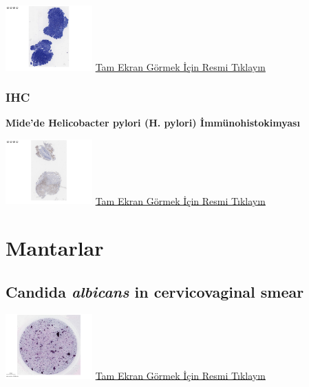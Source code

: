 \documentclass[
  letterpaper,
  DIV=11,
  numbers=noendperiod]{scrreprt}
\begin{document}
\href{https://images.patolojiatlasi.com/helicobacterpylori/giemsa.html}{\includegraphics[width=0.25\textwidth,height=\textheight]{./screenshots/thumbnail_helicobacterpyloriGiemsa.png}}
\href{https://images.patolojiatlasi.com/helicobacterpylori/giemsa.html}{Tam
Ekran Görmek İçin Resmi Tıklayın}

\hypertarget{ihc}{%
\subsection{IHC}\label{ihc}}

\textbf{Mide'de Helicobacter pylori (H. pylori) İmmünohistokimyası}

\href{https://images.patolojiatlasi.com/helicobacterpylori/IHC.html}{\includegraphics[width=0.25\textwidth,height=\textheight]{./screenshots/thumbnail_helicobacterpyloriIHC.png}}
\href{https://images.patolojiatlasi.com/helicobacterpylori/IHC.html}{Tam
Ekran Görmek İçin Resmi Tıklayın}

\hypertarget{sec-mantarlar}{%
\chapter{Mantarlar}\label{sec-mantarlar}}

\hypertarget{sec-candida-albicans-in-cervicovaginal-smear}{%
\section{\texorpdfstring{Candida \emph{albicans} in cervicovaginal
smear}{Candida albicans in cervicovaginal smear}}\label{sec-candida-albicans-in-cervicovaginal-smear}}

\href{https://images.patolojiatlasi.com/candidaalbicans/cervicovaginalsmear/viewer_z0.html}{\includegraphics[width=0.25\textwidth,height=\textheight]{./screenshots/thumbnail_candidaalbicans.png}}
\href{https://images.patolojiatlasi.com/candidaalbicans/cervicovaginalsmear/viewer_z0.html}{Tam
Ekran Görmek İçin Resmi Tıklayın}
\end{document}
